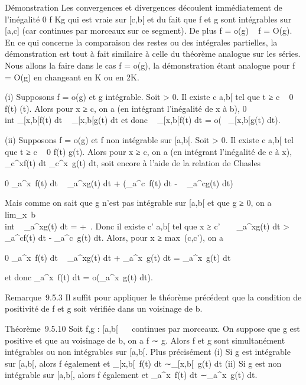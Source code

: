 \documentclass[]{article}
\begin{document}
Démonstration Les convergences et divergences découlent immédiatement de
l'inégalité 0 \leq f \leq Kg qui est vraie sur {[}c,b{[} et du fait que f et g
sont intégrables sur {[}a,c{]} (car continues par morceaux sur ce
segment). De plus f = o(g) \rigtharrow~ f = O(g). En ce qui concerne la comparaison
des restes ou des intégrales partielles, la démonstration est tout à
fait similaire à celle du théorème analogue sur les séries. Nous allons
la faire dans le cas f = o(g), la démonstration étant analogue pour f =
O(g) en changeant \epsilon en K ou en 2K.

(i) Supposons f = o(g) et g intégrable. Soit \epsilon \textgreater{} 0. Il
existe c \in {[}a,b{[} tel que t ≥ c \rigtharrow~ 0 \leq f(t) \leq \epsilong(t). Alors pour x ≥ c,
on a (en intégrant l'inégalité de x à b), 0 \leq\\int
 _{[}x,b{[}f(t) dt \leq \epsilon\int ~
_{[}x,b{[}g(t) dt et donc \int ~
_{[}x,b{[}f(t) dt = o(\int ~
_{[}x,b{[}g(t) dt).

(ii) Supposons f = o(g) et f non intégrable sur {[}a,b{[}. Soit \epsilon
\textgreater{} 0. Il existe c \in {[}a,b{[} tel que t ≥ c \rigtharrow~ 0 \leq f(t) \leq \epsilon
{} g(t). Alors pour x ≥ c, on a (en intégrant
l'inégalité de c à x), \int ~
_c^xf(t) dt \leq \epsilon {}
\int  _c^x~g(t) dt, soit encore à
l'aide de la relation de Chasles

0 \leq\int  _a^x~f(t) dt \leq \epsilon
{} \int ~
_a^xg(t) dt + \left
(\int  _a^c~f(t) dt - \epsilon
{} \int ~
_a^cg(t) dt\right )

Mais comme on sait que g n'est pas intégrable sur {[}a,b{[} et que g ≥
0, on a
lim_x\rightarrow~b\\int ~
_a^xg(t) dt = +\infty~. Donc il existe c' \in {[}a,b{[} tel que x
≥ c' \rigtharrow~ \epsilon {} \int ~
_a^xg(t) dt \textgreater{}\int ~
_a^cf(t) dt - \epsilon {}
\int  _a^c~g(t) dt. Alors, pour x
≥ max~(c,c'), on a

0 \leq\int  _a^x~f(t) dt \leq \epsilon
{} \int ~
_a^xg(t) dt + \epsilon {}
\int  _a^x~g(t) dt =
\epsilon\int  _a^x~g(t) dt

et donc \int  _a^x~f(t) dt =
o(\int  _a^x~g(t) dt).

Remarque~9.5.3 Il suffit pour appliquer le théorème précédent que la
condition de positivité de f et g soit vérifiée dans un voisinage de b.

Théorème~9.5.10 Soit f,g : {[}a,b{[}\rightarrow~ ~ continues par morceaux. On
suppose que g est positive et que au voisinage de b, on a f ∼ g. Alors f
et g sont simultanément intégrables ou non intégrables sur {[}a,b{[}.
Plus précisément (i) Si g est intégrable sur {[}a,b{[}, alors f
également et \int  _{[}x,b{[}~f(t) dt
∼\int  _{[}x,b{[}~g(t) dt (ii) Si g est
non intégrable sur {[}a,b{[}, alors f également et
\int  _a^x~f(t) dt
∼\int  _a^x~g(t) dt.
\end{document}
